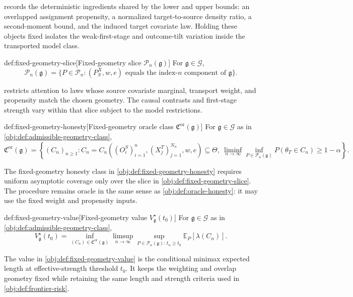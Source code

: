  records the deterministic ingredients shared by the lower and upper bounds: an overlapped assignment propensity, a normalized target-to-source density ratio, a second-moment bound, and the induced target covariate law. Holding these objects fixed isolates the weak-first-stage and outcome-tilt variation inside the transported model class.

\begin{definitionv}{def:fixed-geometry-slice}[Fixed-geometry slice \(\mathcal P_n(\mathfrak g)\)]
For \(\mathfrak g\in\mathcal G\),
\[
\mathcal P_n(\mathfrak g)
=
\{P\in\mathcal P_n:(P_S^X,w,e)\text{ equals the index-}n\text{ component of }\mathfrak g\}.
\]
\end{definitionv}

 restricts attention to laws whose source covariate marginal, transport weight, and propensity match the chosen geometry. The causal contrasts and first-stage strength vary within that slice subject to the model restrictions.

\begin{definitionv}{def:fixed-geometry-honesty}[Fixed-geometry oracle class \(\mathfrak C^{\mathrm{or}}(\mathfrak g)\)]
For \(\mathfrak g\in\mathcal G\) as in \cref{obj:def:admissible-geometry-class},
\[
\mathfrak C^{\mathrm{or}}(\mathfrak g)
=
\left\{
(C_n)_{n\ge1}:
C_n=C_n\!\left((O_i^S)_{i=1}^n,(X_j^T)_{j=1}^{N_n},w,e\right)\subseteq\Theta,\ 
\liminf_{n\to\infty}\inf_{P\in\mathcal P_n(\mathfrak g)}
P(\theta_T\in C_n)\ge1-\alpha
\right\}.
\]
\end{definitionv}

The fixed-geometry honesty class in \cref{obj:def:fixed-geometry-honesty} requires uniform asymptotic coverage only over the slice in \cref{obj:def:fixed-geometry-slice}. The procedure remains oracle in the same sense as \cref{obj:def:oracle-honesty}: it may use the fixed weight and propensity inputs.

\begin{definitionv}{def:fixed-geometry-value}[Fixed-geometry value \(V_{\mathfrak g}^\star(t_0)\)]
For \(\mathfrak g\in\mathcal G\) as in \cref{obj:def:admissible-geometry-class},
\[
V_{\mathfrak g}^\star(t_0)
=
\inf_{(C_n)\in\mathfrak C^{\mathrm{or}}(\mathfrak g)}
\limsup_{n\to\infty}
\sup_{P\in\mathcal P_n(\mathfrak g):\,t_n\ge t_0}
\mathbb E_P[\lambda(C_n)].
\]
\end{definitionv}

The value in \cref{obj:def:fixed-geometry-value} is the conditional minimax expected length at effective-strength threshold \(t_0\). It keeps the weighting and overlap geometry fixed while retaining the same length and strength criteria used in \cref{obj:def:frontier-risk}.

